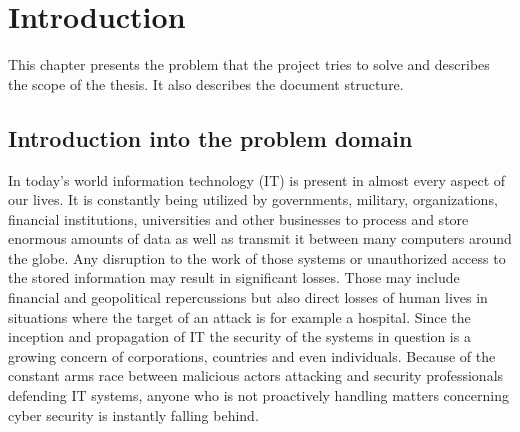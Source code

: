 \documentclass[a4paper,twoside,12pt]{book}
\begin{document}


\chapter{Introduction}

This chapter presents the problem that the project tries to solve and describes the scope 
of the thesis. It also describes the document structure.



\section{Introduction into the problem domain}


In today's world information technology (IT) is present in almost every aspect of our lives. 
It is constantly being utilized by governments, military, organizations, financial institutions,
universities and other businesses to process and store enormous amounts of data as well as 
transmit it between many computers around the globe. Any disruption to the work of those 
systems or unauthorized access to the stored information may result in significant losses.
Those may include financial and geopolitical repercussions but also direct losses of human
lives in situations where the target of an attack is for example a hospital. Since the inception
and propagation of IT the security of the systems in question is a growing concern of corporations, 
countries and even individuals. Because of the constant arms race between malicious actors attacking 
and security professionals defending IT systems, anyone who is not proactively handling matters concerning cyber security 
is instantly falling behind. \cite{bib:articleImportanceOfCybersecurity} 
\end{document}
